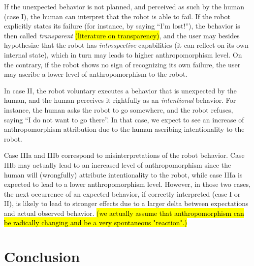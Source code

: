 \documentclass[lettersize, apacite, twoside, HRI]{apa_HRI}
\begin{document}
If the unexpected behavior is not planned, and perceived as such by the human
(case I), the human can interpret that the robot is able to fail. If the robot
explicitly states its failure (for instance, by saying ``I'm lost!''), the
behavior is then called \emph{transparent}  \hl{(literature on transparency)}, and the
user may besides hypothesize that the robot has \emph{introspective}
capabilities (it can reflect on its own internal state), which in turn may
leads to higher anthropomorphism level.  On the contrary, if the robot shows no
sign of recognizing its own failure, the user may ascribe a lower level of
anthropomorphism to the robot.

In case II, the robot voluntary executes a behavior that is unexpected by the
human, and the human perceives it rightfully as an \emph{intentional} behavior.
For instance, the human asks the robot to go somewhere, and the robot refuses,
saying ``I do not want to go there''. In that case, we expect to see an
increase of anthropomorphism attribution due to the human ascribing
intentionality to the robot.

Case IIIa and IIIb correspond to misinterpretations of the robot behavior. Case
IIIb may actually lead to an increased level of anthropomorphism since the human
will (wrongfully) attribute intentionality to the robot, while case IIIa is
expected to lead to a lower anthropomorphism level.  However, in those two
cases, the next occurrence of an expected behavior, if correctly interpreted
(case I or II), is likely to lead to stronger effects due to a larger delta
between expectations and actual observed behavior. \hl{(we actually assume that anthropomorphism can be radically changing and be a very spontaneous "reaction".)}




%
%
%
%
%
%


\section{Conclusion}
\label{sec:9}
\end{document}
